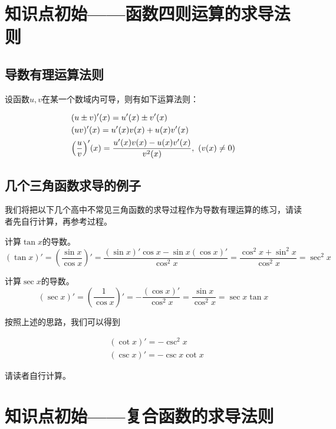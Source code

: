 \section{知识点初始——函数四则运算的求导法则}\label{sec:2.2}

\subsection{导数有理运算法则}\label{sec:2.2.1}

设函数$u,v$在某一个数域内可导，则有如下运算法则：

\begin{equation}
	\begin{split}
		&(u\pm{v})'(x)=u'(x)\pm{v'(x)}\\
		&(uv)'(x)=u'(x)v(x)+u(x)v'(x)\\
		&\qty(\frac{u}{v})'(x)=\frac{u'(x)v(x)-u(x)v'(x)}{v^2(x)},~(v(x)\neq{0})
	\end{split}\label{eq:2.2}
\end{equation}

\subsection{几个三角函数求导的例子}\label{sec:2.2.2}
我们将把以下几个高中不常见三角函数的求导过程作为导数有理运算的练习，请读者先自行计算，再参考过程。

\begin{example}
	计算$\tan{x}$的导数。
	\[(\tan{x})'=(\frac{\sin{x}}{\cos{x}})'=\frac{(\sin{x})'\cos{x}-\sin{x}(\cos{x})'}{\cos^2{x}}=\frac{\cos^2{x}+\sin^2{x}}{\cos^2{x}}=\sec^2{x}\]
\end{example}

\begin{example}
	计算$\sec{x}$的导数。
	\[(\sec{x})'=(\frac{1}{\cos{x}})'=-\frac{(\cos{x})'}{\cos^2{x}}=\frac{\sin{x}}{\cos^2{x}}=\sec{x}\tan{x}\]
\end{example}

按照上述的思路，我们可以得到

\begin{align*}
	&(\cot{x})'=-\csc^2{x}\\
	&(\csc{x})'=-\csc{x}\cot{x}
\end{align*}

请读者自行计算。

\section{知识点初始——复合函数的求导法则}\label{sec:2.3}

